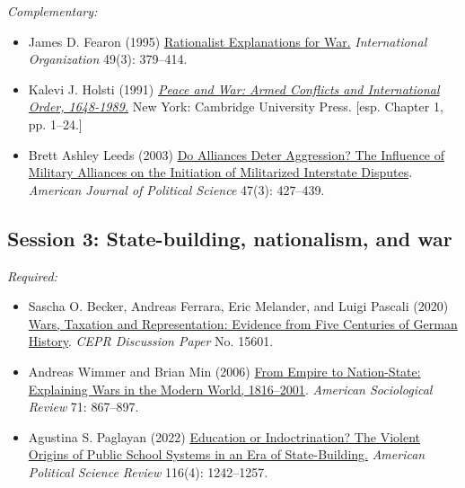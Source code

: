 \documentclass[12pt, a4paper]{article}
\begin{document}
\noindent\textit{Complementary:}

\begin{itemize}
  \item James D. Fearon (1995) \href{https://doi.org/10.1017/S0020818300033324}{Rationalist Explanations for War.} \textit{International Organization} 49(3): 379--414.
  \item Kalevi J. Holsti (1991) \href{https://www.cambridge.org/core/books/peace-and-war/37AEB58913E6EF0834D40EFE086D32FE}{\textit{Peace and War: Armed Conflicts and International Order, 1648-1989.}} New York: Cambridge University Press. [esp. Chapter 1, pp. 1--24.]
	\item Brett Ashley Leeds (2003) \href{https://doi.org/10.1111/1540-5907.00031}{Do Alliances Deter Aggression? The Influence of Military Alliances on the Initiation of Militarized Interstate Disputes}. \textit{American Journal of Political Science} 47(3): 427--439.
\end{itemize}

\subsection*{Session 3: State-building, nationalism, and war}

\noindent\textit{Required:}

\begin{itemize}
	\item Sascha O. Becker, Andreas Ferrara, Eric Melander, and Luigi Pascali (2020) \href{https://cepr.org/publications/dp15601}{Wars, Taxation and Representation: Evidence from Five Centuries of German History}. \textit{CEPR Discussion Paper} No. 15601.
	\item Andreas Wimmer and Brian Min (2006) \href{https://doi.org/10.1177/000312240607100601}{From Empire to Nation-State: Explaining Wars in the Modern World, 1816–2001}. \textit{American Sociological Review} 71: 867--897.
  \item Agustina S. Paglayan (2022) \href{https://doi.org/10.1017/S0003055422000247}{Education or Indoctrination? The Violent Origins of Public School Systems in an Era of State-Building.} \textit{American Political Science Review} 116(4): 1242--1257.
\end{itemize}
\end{document}
